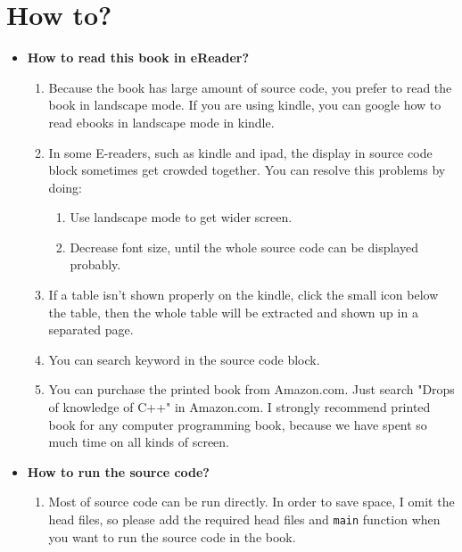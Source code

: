 \documentclass[a4paper,11pt,twoside]{book}
\begin{document}
\chapter*{How to?}
\begin{itemize}
	\item \textbf{How to read this book in eReader?}
	\begin{enumerate}
		\item Because the book has large amount of source code, you prefer to read the book in landscape mode. If you are using kindle, you can google how to read ebooks in landscape mode in kindle. 
		
		\item In some E-readers, such as kindle and ipad, the display in source code block sometimes get crowded together. You can resolve this problems by doing:
		\begin{enumerate}
			\item Use landscape mode to get wider screen.
			\item Decrease font size, until the whole source code can be displayed probably.
		\end{enumerate}
		
		\item If a table isn't shown properly on the kindle, click the small icon below the table, then the whole table will be extracted and shown up in a separated page. 
		
		\item You can search keyword in the source code block.
		
		\item You can purchase the printed book from Amazon.com. Just search "Drops of knowledge of C++" in Amazon.com. I strongly recommend printed book for any computer programming book, because we have spent so much time on all kinds of screen.
	\end{enumerate}

	\item \textbf{How to run the source code?}
	\begin{enumerate}
		\item Most of source code can be run directly. In order to save space, I omit the head files, so please add the required head files and \texttt{main} function when you want to run the source code in the book.
		

\end{enumerate}
\end{itemize}
\end{document}
